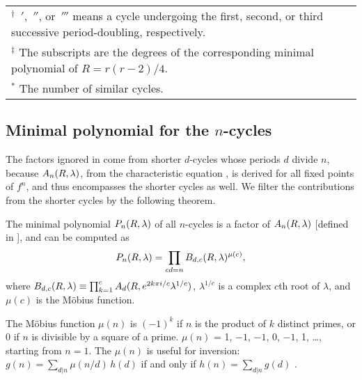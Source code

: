 \documentclass{ws-ijbc}
\begin{document}
\begin{table}[h]
{\begin{tabular}{llllllll}
\hline
\multicolumn{8}{p{\textwidth}}{
$^\dagger$
  $\,'$, $\,''$, or $\,'''$ means
    a cycle undergoing
    the first, second, or third successive period-doubling, respectively.
} \\
\multicolumn{8}{p{\textwidth}}{
$^\ddagger$
  The subscripts are the degrees of the corresponding minimal polynomial
    of $R = r(r-2)/4$.
} \\
\multicolumn{8}{p{\textwidth}}{
$^*$
  The number of similar cycles.
} \\
\hline
\end{tabular}
\label{tab:rval}
}
\end{table}








\subsection{\label{sec:primfac}Minimal polynomial for the $n$-cycles}


The factors ignored in 
  come from shorter $d$-cycles whose periods $d$ divide $n$,
%
  because $A_n(R, \lambda)$,
  from the characteristic equation ,
  is derived for all fixed points of $f^n$,
  and thus encompasses the shorter cycles as well.
%
We filter the contributions from the shorter cycles by the following theorem.


\begin{theorem}
  The minimal polynomial $P_n(R, \lambda)$ of all $n$-cycles
  is a factor of $A_n(R, \lambda)$ [defined in ],
  and can be computed as
  \begin{equation}
    P_n(R, \lambda)
    = \prod_{cd = n} B_{d,c}(R, \lambda)^{\mu(c)},
  \label{eq:primfac}
  \end{equation}
where
  $B_{d, c}(R, \lambda) \equiv \prod_{k=1}^c A_{d}(R, e^{2k\pi i/c} \lambda^{1/c})$,
  $\lambda^{1/c}$ is a complex $c$th root of $\lambda$,
  and $\mu(c)$ is the M\"obius function.
  \label{thm:primfac}
\end{theorem}


\begin{remark}
The M\"obius function $\mu(n)$ is $(-1)^k$
  if $n$ is the product of $k$ distinct primes,
  or 0 if $n$ is divisible by a square of a prime.
$\mu(n)$ = 1, $-1$, $-1$, 0, $-1$, 1, \ldots,
  starting from $n = 1$.
The $\mu(n)$ is useful for inversion:
$g(n) = \sum_{d|n} \mu(n/d) \, h(d)$
if and only if $h(n) = \sum_{d|n} g(d)$
\cite{hardy}.
\end{remark}
\end{document}

